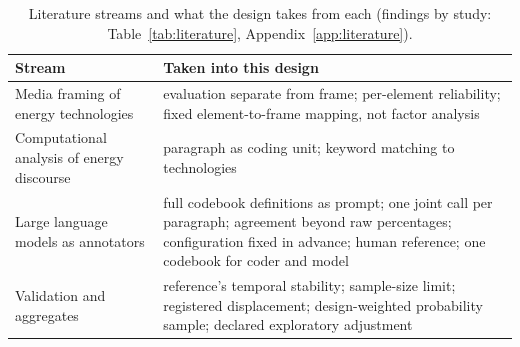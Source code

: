 \begin{table}[htbp]
\centering
\scriptsize
\setlength{\tabcolsep}{4pt}
\renewcommand{\arraystretch}{1.15}
\begin{threeparttable}
\caption[Studies that shaped the design (abridged)]{Literature streams and what the design takes from each (findings by study: Table~\ref{tab:literature}, Appendix~\ref{app:literature}).}
\label{tab:literature_short}
\begin{tabular}{@{}>{\raggedright\arraybackslash}p{38mm}>{\raggedright\arraybackslash}p{112mm}@{}}
\toprule
\textbf{Stream} & \textbf{Taken into this design} \\
\midrule
Media framing of energy technologies & evaluation separate from frame; per-element reliability; fixed element-to-frame mapping, not factor analysis \parencite{stephens2009windmedia,ali2025hydrogenframing} \\
\addlinespace
Computational analysis of energy discourse & paragraph as coding unit; keyword matching to technologies \parencite{toetzke2022energydiscourse} \\
\addlinespace
Large language models as annotators & full codebook definitions as prompt; one joint call per paragraph; agreement beyond raw percentages; configuration fixed in advance; human reference; one codebook for coder and model \parencite{gilardi2023chatgpt,lupo2024humanlevelcoding,toetzke2023llmclimatetech,baumann2025llmhacking,halterman2026codebookllms} \\
\addlinespace
Validation and aggregates & reference's temporal stability; sample-size limit; registered displacement; design-weighted probability sample; declared exploratory adjustment \parencite{song2020validations,linder2026multicalibrated,egami2023dsl} \\
\bottomrule
\end{tabular}
\end{threeparttable}
\end{table}
